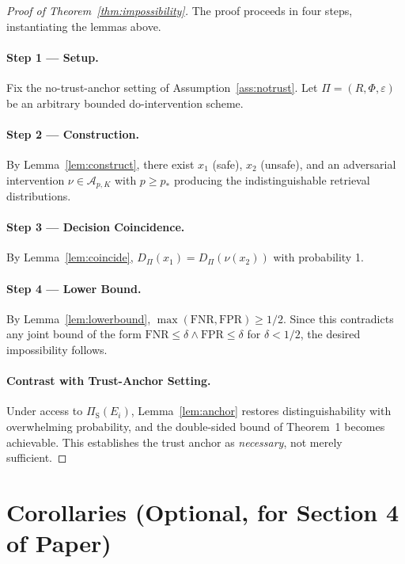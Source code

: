 \documentclass[11pt]{article}
\theoremstyle{plain}
\theoremstyle{definition}
\begin{document}
\begin{proof}[Proof of Theorem~\ref{thm:impossibility}]
The proof proceeds in four steps, instantiating the lemmas above.

\paragraph{Step 1 --- Setup.}
Fix the no-trust-anchor setting of Assumption~\ref{ass:notrust}.
Let $\Pi = (R, \Phi, \varepsilon)$ be an arbitrary bounded do-intervention scheme.

\paragraph{Step 2 --- Construction.}
By Lemma~\ref{lem:construct}, there exist $x_1$ (safe), $x_2$ (unsafe),
and an adversarial intervention $\nu \in \mathcal{A}_{p, K}$ with $p \ge p_*$
producing the indistinguishable retrieval distributions.

\paragraph{Step 3 --- Decision Coincidence.}
By Lemma~\ref{lem:coincide}, $D_\Pi(x_1) = D_\Pi(\nu(x_2))$ with probability 1.

\paragraph{Step 4 --- Lower Bound.}
By Lemma~\ref{lem:lowerbound}, $\max(\mathrm{FNR}, \mathrm{FPR}) \ge 1/2$.
Since this contradicts any joint bound of the form
$\mathrm{FNR} \le \delta \wedge \mathrm{FPR} \le \delta$ for $\delta < 1/2$,
the desired impossibility follows.

\paragraph{Contrast with Trust-Anchor Setting.}
Under access to $\Pi_{\mathrm{S}}(E_i)$, Lemma~\ref{lem:anchor} restores
distinguishability with overwhelming probability, and the double-sided
bound of Theorem~1 becomes achievable. This establishes the trust anchor
as \emph{necessary}, not merely sufficient.
\qedhere
\end{proof}

\section{Corollaries (Optional, for Section 4 of Paper)}
\end{document}
